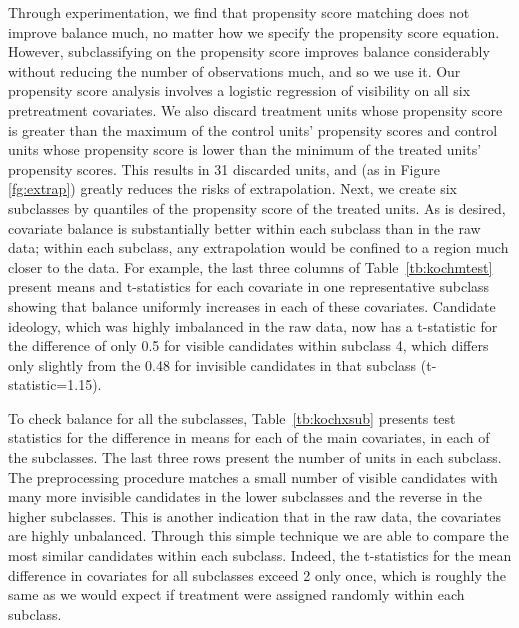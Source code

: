 \documentclass[11pt,titlepage]{article}
\begin{document}
Through experimentation, we find that propensity score matching does
not improve balance much, no matter how we specify the propensity
score equation.  However, subclassifying on the propensity score
improves balance considerably without reducing the number of
observations much, and so we use it.  Our propensity score analysis
involves a logistic regression of visibility on all six pretreatment
covariates.  We also discard treatment units whose propensity score is
greater than the maximum of the control units' propensity scores and control units whose
propensity score is lower than the minimum of the treated units' propensity scores.  This
results in 31 discarded units, and (as in Figure \ref{fg:extrap})
greatly reduces the risks of extrapolation.  Next, we create six
subclasses by quantiles of the propensity score of the treated units.
As is desired, covariate balance is substantially better within each
subclass than in the raw data; within each subclass, any extrapolation
would be confined to a region much closer to the data.  For example,
the last three columns of Table~\ref{tb:kochmtest} present means and
t-statistics for each covariate in one representative subclass showing
that balance uniformly increases in each of these covariates.
Candidate ideology, which was highly imbalanced in the raw data, now
has a t-statistic for the difference of only 0.5 for visible
candidates within subclass 4, which differs only slightly from the
0.48 for invisible candidates in that subclass (t-statistic=1.15).

To check balance for all the subclasses, Table~\ref{tb:kochxsub}
presents test statistics for the difference in means for each of the
main covariates, in each of the subclasses.  The last three rows
present the number of units in each subclass.  The preprocessing
procedure matches a small number of visible candidates with many more
invisible candidates in the lower subclasses and the reverse in the
higher subclasses.  This is another indication that in the raw data,
the covariates are highly unbalanced.  Through this simple technique
we are able to compare the most similar candidates within each
subclass.  Indeed, the t-statistics for the mean difference in
covariates for all subclasses exceed 2 only once, which is roughly the
same as we would expect if treatment were assigned randomly within
each subclass.
\end{document}
